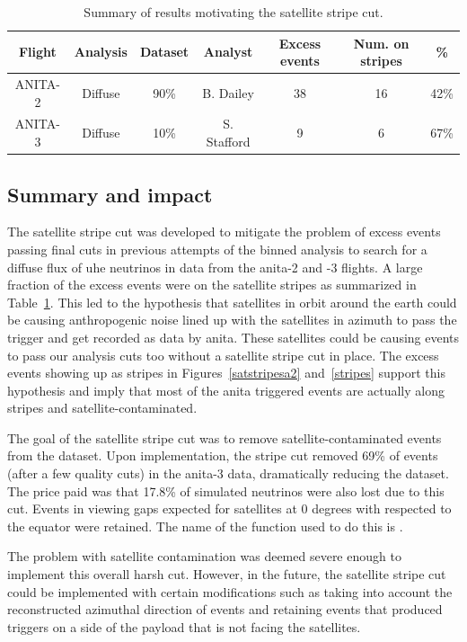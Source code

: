 \begin{table}
\centering
\begin{tabular}{ |c|c|c|c|c|c|c| } 
\hline
Flight & Analysis & Dataset & Analyst & Excess events & Num. on stripes & \% \\
\hline
ANITA-2 & Diffuse & 90\% & B. Dailey & 38 & 16 & 42\%\\
ANITA-3 & Diffuse & 10\% & S. Stafford & 9 & 6 & 67\%\\
\hline
\end{tabular}
\caption{Summary of results motivating the satellite stripe cut.}
\label{stripe_cut}
\end{table}


\subsection{Summary and impact}

The satellite stripe cut was developed to mitigate the problem of excess events passing final cuts in previous attempts of the binned analysis to search for a diffuse flux of \gls{uhe} neutrinos in data from the \gls{anita}-2 and -3 flights. A large fraction of the excess events were on the satellite stripes as summarized in Table~\ref{stripe_cut}. This led to the hypothesis that satellites in orbit around the earth could be causing anthropogenic noise lined up with the satellites in azimuth to pass the trigger and get recorded as data by \gls{anita}. These satellites could be causing events to pass our analysis cuts too without a satellite stripe cut in place. The excess events showing up as stripes in Figures~\ref{satstripesa2} and~\ref{stripes} support this hypothesis and imply that most of the \gls{anita} triggered events are actually along stripes and satellite-contaminated. 

The goal of the satellite stripe cut was to remove satellite-contaminated events from the dataset. Upon implementation, the stripe cut removed 69\% of events (after a few quality cuts) in the \gls{anita}-3 data, dramatically reducing the dataset. The price paid was that 17.8\% of simulated neutrinos were also lost due to this cut. Events in viewing gaps expected for satellites at 0 degrees with respected to the equator were retained. The name of the function used to do this is . 

The problem with satellite contamination was deemed severe enough to implement this overall harsh cut. However, in the future, the satellite stripe cut could be implemented with certain modifications such as taking into account the reconstructed azimuthal direction of events and retaining events that produced triggers on a side of the payload that is not facing the satellites.